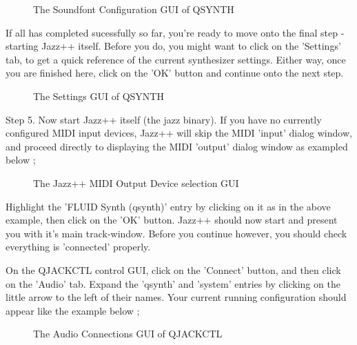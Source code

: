 \documentclass[letterpaper]{report}
\begin{document}
\begin{figure}%
%
%
\caption{The Soundfont Configuration GUI of QSYNTH}%
\end{figure}



If all has completed sucessfully so far, you're ready to move onto
the final step - starting Jazz++ itself. Before you do, you might
want to click on the 'Settings' tab, to get a quick reference of the
current synthesizer settings. Either way, once you are finished here,
click on the 'OK' button and continue onto the next step.



\begin{figure}%
%
%
\caption{The Settings GUI of QSYNTH}%
\end{figure}


Step 5. Now start Jazz++ itself (the jazz binary). If you have no 
currently configured MIDI input devices, Jazz++ will skip the MIDI 'input'
dialog window, and proceed directly to displaying  the MIDI 'output'
dialog window as exampled below ;



\begin{figure}%
%
%
\caption{The Jazz++ MIDI Output Device selection GUI}%
\end{figure}



Highlight the 'FLUID Synth (qsynth)' entry by clicking on it as in the
above example, then click on the 'OK' button. Jazz++ should now start
and present you with it's main track-window. Before you continue however,
you should check everything is 'connected' properly.

On the QJACKCTL control GUI, click on the 'Connect' button, and then
click on the 'Audio' tab. Expand the 'qsynth' and 'system' entries by
clicking on the little arrow to the left of their names. Your current
running configuration should appear like the example below ;



\begin{figure}%
%
%
\caption{The Audio Connections GUI of QJACKCTL}%
\end{figure}
\end{document}

